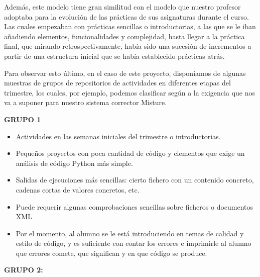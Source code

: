 Además, este modelo tiene gran similitud con el modelo que nuestro profesor adoptaba para la evolución de las prácticas de sus asignaturas durante el curso. Las cuales empezaban con prácticas sencillas o introductorias, a las que se le iban añadiendo elementos, funcionalidades y complejidad, hasta llegar a la práctica final, que mirando retrospectivamente, había sido una sucesión de incrementos a partir de una estructura inicial que se había establecido prácticas atrás.


Para observar esto último, en el caso de este proyecto, disponíamos de algunas muestras de grupos de repositorios de actividades en diferentes etapas del trimestre, los cuales, por ejemplo, podemos clasificar según a la exigencia que nos va a suponer para nuestro sistema corrector Misture. \newpage	%




\textbf{GRUPO 1}


\begin{itemize}
\item Actividades en las semanas iniciales del trimestre o introductorias.

\item Pequeños proyectos con poca cantidad de código y elementos que exige un análisis de código Python más simple.

\item Salidas de ejecuciones más sencillas: cierto fichero con un contenido concreto, cadenas cortas de valores concretos, etc.

\item Puede requerir algunas comprobaciones sencillas sobre ficheros o documentos XML

\item Por el momento, al alumno se le está introduciendo en temas de calidad y estilo de código, y es suficiente con contar los errores e imprimirle al alumno que errores comete, que significan y en que código se produce.
\end{itemize}

\vspace{1cm}
\textbf{GRUPO 2:}


